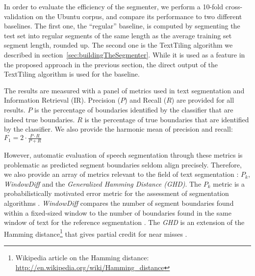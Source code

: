 In order to evaluate the efficiency of the segmenter, we perform a 10-fold cross-validation on the Ubuntu corpus, and compare its performance to two different baselines. The first one, the ``regular'' baseline, is computed by segmenting the test set into regular segments of the same length as the average training set segment length, rounded up. The second one is the TextTiling algorithm we described in section~\ref{sec:buildingTheSegmenter}.
While it is used as a feature in the proposed approach in the previous section, the direct output of the TextTiling algorithm is used for the baseline.


The results are measured with a panel of metrics used in text segmentation and Information Retrieval (IR).
%
Precision ($P$) and Recall ($R$) are provided for all results. $P$ is the percentage of boundaries identified by the classifier that are indeed true boundaries. $R$ is the percentage of true boundaries that are identified by the classifier. 
We also provide the harmonic mean of precision and recall:
$  F_1 = 2 \cdot \frac{P \cdot R}{P + R}$

However, automatic evaluation of speech segmentation through these metrics is problematic as predicted segment boundaries seldom align precisely. 
Therefore, %
 we also provide an array of metrics relevant to the field of text segmentation : ${P_{k}}$, \textit{WindowDiff} and the \textit{Generalized Hamming Distance (GHD)}.
%
The ${P_{k}}$ metric is a probabilistically motivated error metric for the assessment of segmentation algorithms \cite{beeferman1999statistical}.
%
\textit{WindowDiff} compares the number of segment boundaries found within a fixed-sized window to the number of boundaries found in the same window of text for the reference segmentation \cite{pevzner2002critique}.
%
The \textit{GHD} is an extension of the Hamming distance\footnote{Wikipedia article on the Hamming distance: \url{http://en.wikipedia.org/wiki/Hamming_distance}} that gives partial credit for near misses \cite{bookstein2002generalized}.


